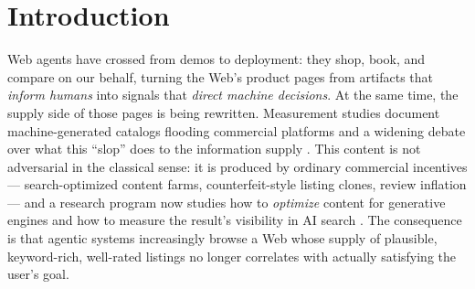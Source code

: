 \section{Introduction}
\label{sec:intro}
Web agents have crossed from demos to deployment: they shop, book, and
compare on our behalf, turning the Web's product pages from artifacts that
\emph{inform humans} into signals that \emph{direct machine decisions}. At
the same time, the supply side of those pages is being rewritten. Measurement studies document
machine-generated catalogs flooding commercial platforms
\cite{wu2026empirical} and a widening debate over what this ``slop''
does to the information supply \cite{kommers2025slop}.
This content is not adversarial in the classical sense: it is produced
by ordinary commercial incentives --- search-optimized content farms,
counterfeit-style listing clones, review inflation --- and a research
program now studies how to \emph{optimize} content for generative engines
\cite{wu2025what,bagga2025egeo,nimase2026geobench} and how to measure the result's
visibility in AI search \cite{chen2025generative,schulte2026dont,kumar2026generative}. The
consequence is that agentic systems increasingly browse a Web
whose supply of plausible, keyword-rich, well-rated listings no longer
correlates with actually satisfying the user's goal.

